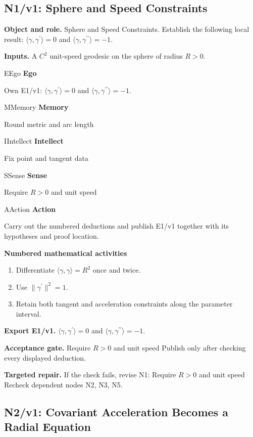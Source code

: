\documentclass[preprint,12pt,aps,pra,showkeys,amsmath,amssymb,superscriptaddress,floatfix]{revtex4-2}
\theoremstyle{definition}
\theoremstyle{remark}
\newcommand{\mmfaculty}[3]{%
 \begin{mmfacultybox}{#1}{#2}
 {\sffamily\bfseries\color{MMBlue}#2}\par\smallskip #3
 \end{mmfacultybox}}
\newcommand{\field}[2]{\par\smallskip\noindent\textbf{#1.} #2\par}
\begin{document}
\subsection{N1/v1: Sphere and Speed Constraints}

\field{Object and role}{Sphere and Speed Constraints. Establish the following local result:
\(\langle\gamma,\gamma^{\prime}\rangle=0\) and
\(\langle\gamma,\gamma^{\prime\prime}\rangle=-1\).}

\field{Inputs}{A \(C^2\) unit-speed geodesic on the sphere of radius \(R>0\).}

\mmfaculty{E}{Ego}{Own E1/v1: \(\langle\gamma,\gamma^{\prime}\rangle=0\) and
\(\langle\gamma,\gamma^{\prime\prime}\rangle=-1\).}

\mmfaculty{M}{Memory}{Round metric and arc length}

\mmfaculty{I}{Intellect}{Fix point and tangent data}

\mmfaculty{S}{Sense}{Require \(R>0\) and unit speed}

\mmfaculty{A}{Action}{Carry out the numbered deductions and publish E1/v1 together with its
hypotheses and proof location.}

\smallskip\noindent\textbf{Numbered mathematical activities}

\begin{enumerate}[label=N1.\arabic*,leftmargin=3.4em]

\item Differentiate \(\langle\gamma,\gamma\rangle=R^2\) once and twice.

\item Use \(\|\gamma^{\prime}\|^2=1\).

\item Retain both tangent and acceleration constraints along the parameter
interval.

\end{enumerate}

\field{Export E1/v1}{\(\langle\gamma,\gamma^{\prime}\rangle=0\) and
\(\langle\gamma,\gamma^{\prime\prime}\rangle=-1\).}

\field{Acceptance gate}{Require \(R>0\) and unit speed Publish only after checking every
displayed deduction.}

\field{Targeted repair}{If the check fails, revise N1: Require \(R>0\) and unit speed Recheck
dependent nodes N2, N3, N5.}

\clearpage

\subsection{N2/v1: Covariant Acceleration Becomes a Radial Equation}
\end{document}
